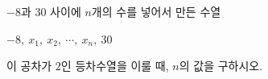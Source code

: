 $-8$과 $30$ 사이에 $n$개의 수를 넣어서 만든 수열\par\smallskip\noindent\hspace*{1.5em}$-8,\ x_1,\ x_2,\ \cdots,\ x_n,\ 30$\par\smallskip\noindent 이 공차가 $2$인 등차수열을 이룰 때, $n$의 값을 구하시오.

